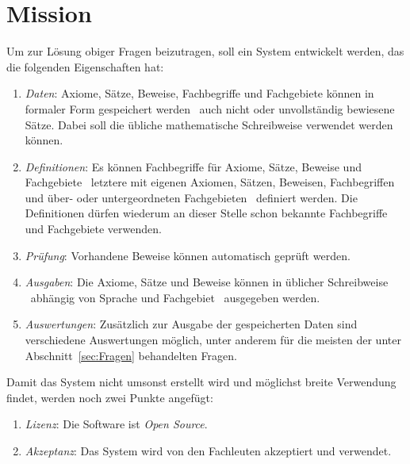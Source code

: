 \documentclass[english,ngerman,parskip=half,headsepline,footsepline]{scrreprt}
\newcounter{Enumi}
\begin{document}
	\section{Mission} %
	\label{sec:Mission}

	Um zur Lösung obiger Fragen beizutragen, soll ein System entwickelt werden, das die folgenden Eigenschaften hat:

	\begin{enumerate}

		\item \label{Mission:Daten} \emph{Daten}: Axiome, Sätze, Beweise, Fachbegriffe und Fachgebiete können in formaler Form gespeichert werden \textendash\ auch nicht oder unvollständig bewiesene Sätze. Dabei soll die übliche mathematische Schreibweise verwendet werden können.

		\item \label{Mission:Definitionen} \emph{Definitionen}: Es können Fachbegriffe für Axiome, Sätze, Beweise und Fachgebiete \textendash\ letztere mit eigenen Axiomen, Sätzen, Beweisen, Fachbegriffen und über- oder untergeordneten Fachgebieten \textendash\ definiert werden. Die Definitionen dürfen wiederum an dieser Stelle schon bekannte Fachbegriffe und Fachgebiete verwenden.

		\item \label{Mission:Prüfung} \emph{Prüfung}: Vorhandene Beweise können automatisch geprüft werden.

		\item \label{Mission:Ausgaben} \emph{Ausgaben}: Die Axiome, Sätze und Beweise können in üblicher Schreibweise \textendash\ abhängig von Sprache und Fachgebiet \textendash\ ausgegeben werden.

		\item \label{Mission:Auswertungen} \emph{Auswertungen}: Zusätzlich zur Ausgabe der gespeicherten Daten sind verschiedene Auswertungen möglich, unter anderem für die meisten der unter Abschnitt~\vref{sec:Fragen} behandelten Fragen.

		\setcounter{Enumi}{\value{enumi}}
	\end{enumerate}

	Damit das System nicht umsonst erstellt wird und möglichst breite Verwendung findet, werden noch zwei Punkte angefügt:

	\begin{enumerate}
		\setcounter{enumi}{\value{Enumi}}

		\item \label{Mission:Lizenz} \emph{Lizenz}: Die Software ist \emph{Open Source}.

		\item \label{Mission:Akzeptanz} \emph{Akzeptanz}: Das System wird von den Fachleuten akzeptiert und verwendet.

	\end{enumerate}
\end{document}
